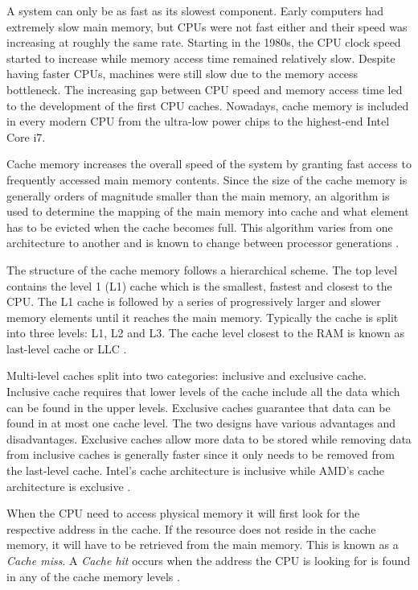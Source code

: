 \documentclass[10pt,a4paper,twoside]{book}
\begin{document}
A system can only be as fast as its slowest component. Early computers had extremely slow main memory, but CPUs were not fast either and their speed was increasing at roughly the same rate. Starting in the 1980s, the CPU clock speed started to increase while memory access time remained relatively slow. Despite having faster CPUs, machines were still slow due to the memory access bottleneck. The increasing gap between CPU speed and memory access time led to the development of the first CPU caches. Nowadays, cache memory is included in every modern CPU from the ultra-low power chips to the highest-end Intel Core i7.

Cache memory increases the overall speed of the system by granting fast access to frequently accessed main memory contents. Since the size of the cache memory is generally orders of magnitude smaller than the main memory, an algorithm is used to determine the mapping of the main memory into cache and what element has to be evicted when the cache becomes full. This algorithm varies from one architecture to another and is known to change between processor generations \cite{oren2015spy}. 

The structure of the cache memory follows a hierarchical scheme. The top level contains the level 1 (L1) cache which is the smallest, fastest and closest to the CPU. The L1 cache is followed by a series of progressively larger and slower memory elements until it reaches the main memory. Typically the cache is split into three levels: L1, L2 and L3. The cache level closest to the RAM is known as last-level cache or LLC \cite{oren2015spy}.

Multi-level caches split into two categories: inclusive and exclusive cache. Inclusive cache requires that lower levels of the cache include all the data which can be found in the upper levels. Exclusive caches guarantee that data can be found in at most one cache level. The two designs have various advantages and disadvantages. Exclusive caches allow more data to be stored while removing data from inclusive caches is generally faster since it only needs to be removed from the last-level cache. Intel's cache architecture is inclusive while AMD's cache architecture is exclusive \cite{oren2015spy}.

When the CPU need to access physical memory it will first look for the respective address in the cache. If the resource does not reside in the cache memory, it will have to be retrieved from the main memory. This is known as a \textit{Cache miss}. A \textit{Cache hit} occurs when the address the CPU is looking for is found in any of the cache memory levels \cite{oren2015spy}.
\end{document}
